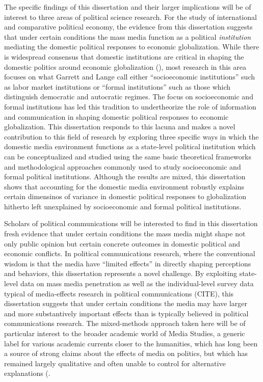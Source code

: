\documentclass[12pt]{report}
\begin{document}
The specific findings of this dissertation and their larger implications will be of interest to three areas of political science research. For the study of international and comparative political economy, the evidence from this dissertation suggests that under certain conditions the mass media function as a political \emph{institution} mediating the domestic political responses to economic globalization. While there is widespread consensus that domestic institutions are critical in shaping the domestic politics around economic globalization (\citealt{Garrett:1995tf, Adsera:2002vt}), most research in this area focuses on what Garrett and Lange call either ``socioeconomic institutions'' such as labor market institutions or ``formal institutions'' such as those which distinguish democratic and autocratic regimes. The focus on socioeconomic and formal institutions has led this tradition to undertheorize the role of information and communication in shaping domestic political responses to economic globalization. This dissertation responds to this lacuna and makes a novel contribution to this field of research by exploring three specific ways in which the domestic media environment functions as a state-level political institution which can be conceptualized and studied using the same basic theoretical frameworks and methodological approaches commonly used to study socioeconomic and formal political institutions. Although the results are mixed, this dissertation shows that accounting for the domestic media environment robustly explains certain dimensinos of variance in domestic political responses to globalization hitherto left unexplained by socioeconomic and formal political institutions.

Scholars of political communications will be interested to find in this dissertation fresh evidence that under certain conditions the mass media might shape not only public opinion but certain concrete outcomes in domestic political and economic conflicts. In political communications research, where the conventional wisdom is that the media have ``limited effects'' in directly shaping perceptions and behaviors, this dissertation represents a novel challenge. By exploiting state-level data on mass media penetration as well as the individual-level survey data typical of media-effects research in political communications (CITE), this dissertation suggests that under certain conditions the media may have larger and more substantively important effects than is typically believed in political communications research. The mixed-methods approach taken here will be of particular interest to the broader academic world of Media Studies, a generic label for various academic currents closer to the humanities, which has long been a source of strong claims about the effects of media on politics, but which has remained largely qualitative and often unable to control for alternative explanations (\citealt{Debord:1967vn,McLuhan:1994tf,Chomsky:1991ty}. 
\end{document}
